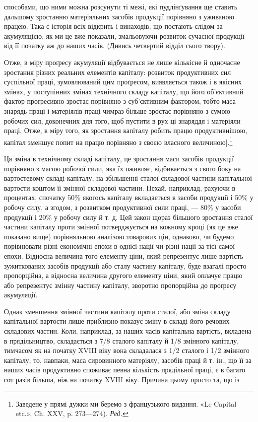 \parcont{}  %
способами, що ними можна розсунути ті межі, які пудлінґування
ще ставить дальшому зростанню матеріяльних засобів продукції
порівняно з уживаною працею. Така є історія всіх відкрить
і винаходів, що постають слідом за акумуляцією, як ми це
вже показали, змальовуючи розвиток сучасної продукції від її
початку аж до наших часів. (Дивись четвертий відділ сього
твору).

Отже, в міру проґресу акумуляції відбувається не лише
кількісне й одночасне зростання різних реальних елементів
капіталу: розвиток продуктивних сил суспільної праці, зумовлюваний
цим проґресом, виявляється також і в якісних змінах,
у поступінних змінах технічного складу капіталу, що його об’єктивний
фактор проґресивно зростає порівняно з суб’єктивним
фактором, тобто маса знарядь праці і матеріялів праці чимраз
більше зростає порівняно з сумою робочих сил, доконечних для
того, щоб пустити в рух ці знаряддя і матеріяли праці. Отже,
в міру того, як зростання капіталу робить працю продуктивнішою,
капітал зменшує попит на працю порівняно з своєю власного
величиною].\footnote*{
Заведене у прямі дужки ми беремо з французького видання.
«Le Capital etc.», Ch. XXV, p. 273—274). \emph{Ред.}
}

Ця зміна в технічному складі капіталу, це зростання маси
засобів продукції порівняно з масою робочої сили, яка їх оживляє,
відбивається з свого боку на вартостевому складі капіталу, на
збільшенні сталої складової частини капітальної вартости коштом
її змінної складової частини. Нехай, наприклад, рахуючи
в процентах, спочатку 50\% якогось капіталу вкладається в засоби
продукції і 50\% у робочу силу, а згодом, з розвитком продуктивної
сили праці, — 80\% у засоби продукції і 20\% у робочу силу
й т. д. Цей закон щораз більшого зростання сталої частини капіталу
проти змінної потверджується на кожному кроці (як це вже
показано вище) порівняльною аналізою товарових цін, однаково,
чи будемо порівнювати різні економічні епохи в однієї нації
чи різні нації за тієї самої епохи. Відносна величина того елементу
ціни, який репрезентує лише вартість зужиткованих засобів
продукції або сталу частину капіталу, буде взагалі просто
пропорційна, а відносна величина другого елементу ціни, який
оплачує працю або репрезентує змінну частину капіталу, зворотно
пропорційна до проґресу акумуляції.

Однак зменшення змінної частини капіталу проти сталої,
або зміна складу капітальної вартости лише приблизно показує
зміну в складі його речових складових частин. Коли, наприклад,
за наших часів капітальна вартість, вкладена в прядільництво,
складається з 7/8 сталого капіталу й 1/8 змінного капіталу, тимчасом
як на початку XVIII віку вона складалася з 1/2 сталого
і 1/2 змінного капіталу, то, навпаки, маса сировинного матеріялу,
засобів праці й т. ін., що її за наших часів продуктивно споживає
певна кількість прядільної праці, є в багато сот разів більша,
ніж на початку XVIII віку. Причина цьому просто та, що із
\parbreak{}  %
